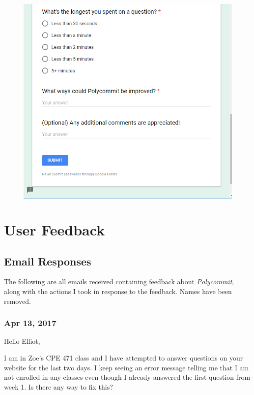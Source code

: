 \begin{appendices}
\begin{figure}[h!]
	\includegraphics[width=1.0\linewidth]{figures/survey3}
	\label{fig:survey3}
\end{figure}

\chapter{User Feedback}

\section{Email Responses}

\par The following are all emails received containing feedback about \textit{Polycommit}, along with the actions I took in response to the feedback. Names have been removed.

\subsection{Apr 13, 2017}

{\fontsize{12pt}{8pt}\selectfont
Hello Elliot,

I am in Zoe's CPE 471 class and I have attempted to answer questions on your website for the last two days. I keep seeing an error message telling me that I am not enrolled in any classes even though I already answered the first question from week 1. Is there any way to fix this?

}
\end{appendices}
